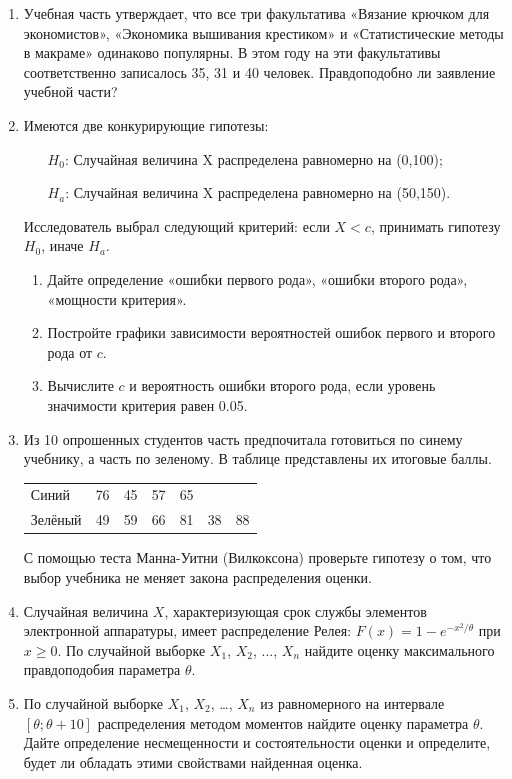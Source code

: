 \begin{enumerate}
\item Учебная часть утверждает, что все три факультатива «Вязание крючком для экономистов», «Экономика вышивания крестиком» и «Статистические методы в макраме» одинаково популярны. В этом году на эти факультативы соответственно записалось 35, 31 и 40 человек. Правдоподобно ли заявление учебной части?
\item Имеются две конкурирующие гипотезы:
\begin{enumerate}
\item[$H_0$:] Случайная величина X распределена равномерно на (0,100);
\item[$H_a$:] Случайная величина X распределена равномерно на (50,150).
\end{enumerate}
Исследователь выбрал следующий критерий: если $X<c$, принимать гипотезу $H_0$, иначе  $H_a$.
\begin{enumerate}
\item Дайте определение «ошибки первого рода», «ошибки второго рода», «мощности критерия».
\item Постройте графики зависимости вероятностей ошибок первого и второго рода от $c$.
\item Вычислите $c$ и вероятность ошибки второго рода, если уровень значимости критерия равен 0.05.
\end{enumerate}
\item Из 10 опрошенных студентов часть предпочитала готовиться по синему учебнику, а часть по зеленому. В таблице представлены их итоговые баллы.

\begin{tabular}{@{}lcccccc@{}}
\toprule
Синий   & 76 & 45 & 57 & 65 &    &    \\
Зелёный & 49 & 59 & 66 & 81 & 38 & 88 \\ \bottomrule
\end{tabular}


С помощью теста Манна-Уитни (Вилкоксона) проверьте гипотезу о том, что выбор учебника не меняет закона распределения оценки.

\item Случайная величина $X$, характеризующая срок службы элементов электронной аппаратуры, имеет распределение Релея: $F(x)=1-e^{-x^2/\theta}$ при $x\geq 0$. По случайной выборке $X_1$, $X_2$, ..., $X_n$ найдите оценку максимального правдоподобия параметра $\theta$.

\item По случайной выборке $X_1$, $X_2$, \ldots, $X_n$ из равномерного на интервале $[\theta;\theta+10]$ распределения методом моментов найдите оценку параметра $\theta$. Дайте определение несмещенности и состоятельности оценки и определите, будет ли обладать этими свойствами найденная оценка.


\end{enumerate}
